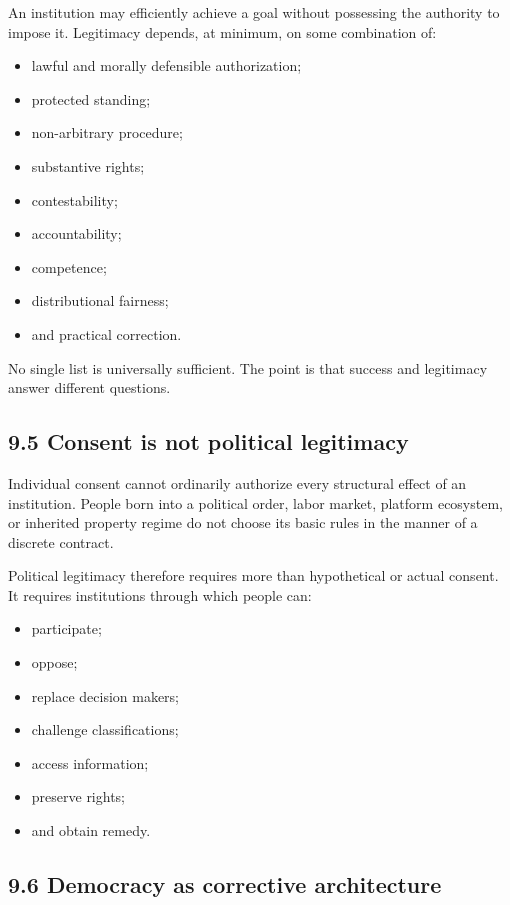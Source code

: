 \documentclass[
  11pt,
]{article}
\providecommand{\tightlist}{%
  \setlength{\itemsep}{0pt}\setlength{\parskip}{0pt}}
\begin{document}
An institution may efficiently achieve a goal without possessing the
authority to impose it. Legitimacy depends, at minimum, on some
combination of:

\begin{itemize}
\tightlist
\item
  lawful and morally defensible authorization;
\item
  protected standing;
\item
  non-arbitrary procedure;
\item
  substantive rights;
\item
  contestability;
\item
  accountability;
\item
  competence;
\item
  distributional fairness;
\item
  and practical correction.
\end{itemize}

No single list is universally sufficient. The point is that success and
legitimacy answer different questions.

\subsection{9.5 Consent is not political
legitimacy}\label{consent-is-not-political-legitimacy}

Individual consent cannot ordinarily authorize every structural effect
of an institution. People born into a political order, labor market,
platform ecosystem, or inherited property regime do not choose its basic
rules in the manner of a discrete contract.

Political legitimacy therefore requires more than hypothetical or actual
consent. It requires institutions through which people can:

\begin{itemize}
\tightlist
\item
  participate;
\item
  oppose;
\item
  replace decision makers;
\item
  challenge classifications;
\item
  access information;
\item
  preserve rights;
\item
  and obtain remedy.
\end{itemize}

\subsection{9.6 Democracy as corrective
architecture}\label{democracy-as-corrective-architecture}
\end{document}
